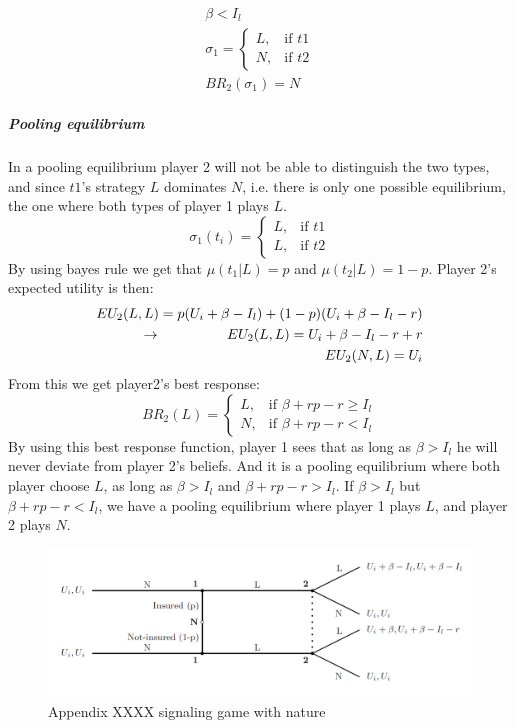 \begin{eqnarray}
\beta<I_{l}\\
 \sigma_{1}= 
\begin{cases}
   L,& \text{if } t1\\
   N,& \text{if } t2  
\end{cases}\\
BR_{2}(\sigma_{1})=N
\end{eqnarray} 
\subparagraph{Pooling equilibrium}
In a pooling equilibrium player 2 will not be able to distinguish the two types, and since $t1$'s strategy $L$ dominates $N$, i.e. there is only one possible equilibrium, the one where both types of player 1 plays $L$.
\begin{equation}
    \sigma_{1}(t_{i})= 
\begin{cases}
   L,& \text{if } t1\\
   L,& \text{if } t2  
\end{cases}
\label{eq:player2beliefpooling}
\end{equation}
By using bayes rule we get that $\mu(t_{1}|L)=p$ and $\mu(t_{2}|L)=1-p$.
Player 2's expected utility is then:
\begin{eqnarray}
EU_{2}(L,L)=p(U_{i}+\beta-I_{l})+(1-p)(U_{i}+\beta-I_{l}-r)\nonumber\\
\llap{$\rightarrow$\hspace{50pt}}EU_{2}(L,L)=U_{i}+\beta-I_{l}-r+r\\
EU_{2}(N,L)=U_{i}
\end{eqnarray}
From this we get player2's best response:
\begin{equation}
BR_{2}(L)=
\begin{cases}
L ,& \text{if } \beta + rp-r\geq I_{l} \\
N ,& \text{if } \beta +rp -r < I_{l} 
\end{cases}
\end{equation}
By using this best response function, player 1 sees that as long as $\beta>I_{l}$ he will never deviate from player 2's beliefs. And it is a pooling equilibrium where both player choose $L$, as long as $\beta>I_{l}$ and $\beta +rp-r>I_{l}$.
If $\beta>I_{l}$ but $\beta +rp-r<I_{l}$, we have a pooling equilibrium where player 1 plays $L$, and player 2 plays $N$. 
\begin{figure}[h]
\centering

  \centering
\includegraphics[width=1\linewidth]{../Figures/SignalingGameInsured.png}

\caption{Appendix XXXX signaling game with nature \label{fig:signalingInsured}}



\end{figure}